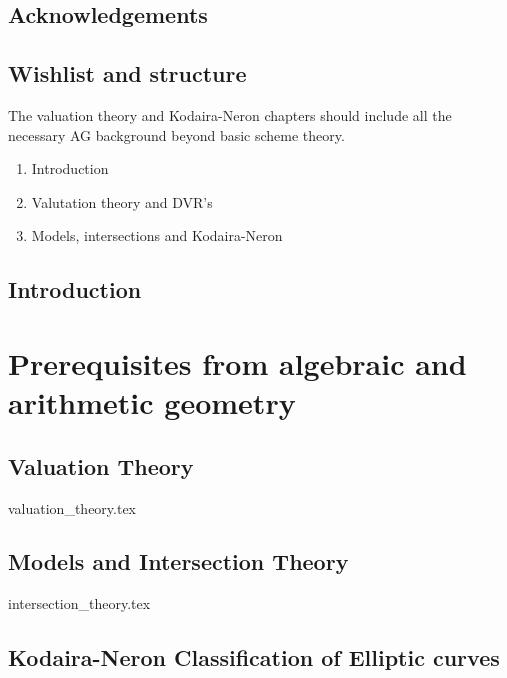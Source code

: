 


\rmfamily
\setcounter{page}{0}
\newpage
\tableofcontents
\listoftodos
\chapter*{Acknowledgements} \label{chap:acknowledgements}

\setcounter{chapter}{-1}
\chapter{Wishlist and structure} \label{chap:wishlist}
The valuation theory and Kodaira-Neron chapters should include all the necessary AG background beyond basic scheme theory. 
\begin{enumerate}
	\item Introduction
	\item Valutation theory and DVR's
	\item Models, intersections and Kodaira-Neron
\end{enumerate}


\setcounter{page}{0}

\chapter{Introduction} \label{chap:introduction}
%

\part{Prerequisites from algebraic and arithmetic geometry}
\chapter{Valuation Theory} \label{chap:valuation_theory}
{valuation_theory.tex}



\chapter{Models and Intersection Theory} \label{chap:models_and_intersection_theory}
{intersection_theory.tex}

\chapter{Kodaira-Neron Classification of Elliptic curves} \label{chap:kodaira-neron_classification_of_elliptic_curves}

